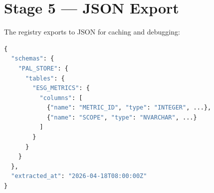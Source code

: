 \section{Stage 5 --- JSON Export}

The registry exports to JSON for caching and debugging:

\begin{lstlisting}[language=Python,caption={JSON export format}]
{
  "schemas": {
    "PAL_STORE": {
      "tables": {
        "ESG_METRICS": {
          "columns": [
            {"name": "METRIC_ID", "type": "INTEGER", ...},
            {"name": "SCOPE", "type": "NVARCHAR", ...}
          ]
        }
      }
    }
  },
  "extracted_at": "2026-04-18T08:00:00Z"
}
\end{lstlisting}

\newpage
